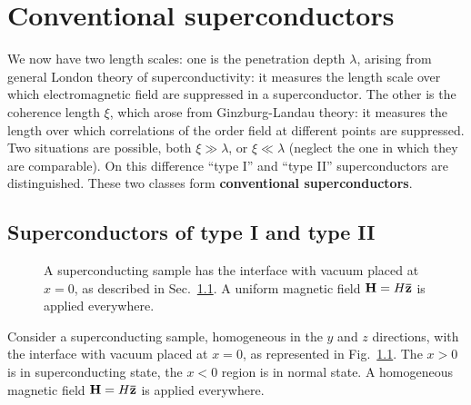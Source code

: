 \chapter{Conventional superconductors}\label{chap:conventional superconductors}\chaptertoc{}

We now have two length scales: one is the penetration depth $\lambda$, arising from general London theory of superconductivity: it measures the length scale over which electromagnetic field are suppressed in a superconductor. The other is the coherence length $\xi$, which arose from Ginzburg-Landau theory: it measures the length over which correlations of the order field at different points are suppressed. Two situations are possible, both $\xi \gg \lambda$, or $\xi \ll \lambda$ (neglect the one in which they are comparable). On this difference ``type I'' and ``type II'' superconductors are distinguished. These two classes form \textbf{conventional superconductors}.

\section{Superconductors of type I and type II}\label{sec:superconductors of type I and type II}

\begin{figure}
    \centering
    
    \caption{A superconducting sample has the interface with vacuum placed at $x=0$, as described in Sec.~\ref{sec:superconductors of type I and type II}. A uniform magnetic field $\mathbf{H} = H \mathbf{\bar{z}}$ is applied everywhere.}
    \label{fig:superconducting sample}
\end{figure}

Consider a superconducting sample, homogeneous in the $y$ and $z$ directions, with the interface with vacuum placed at $x=0$, as represented in Fig.~\ref{fig:superconducting sample}. The $x>0$ is in superconducting state, the $x<0$ region is in normal state. A homogeneous magnetic field $\mathbf{H} = H \mathbf{\bar{z}}$ is applied everywhere. 

